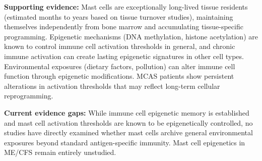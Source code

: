 \begin{open_question}
\textbf{Supporting evidence:} Mast cells are exceptionally long-lived tissue residents (estimated months to years based on tissue turnover studies), maintaining themselves independently from bone marrow and accumulating tissue-specific programming. Epigenetic mechanisms (DNA methylation, histone acetylation) are known to control immune cell activation thresholds in general, and chronic immune activation can create lasting epigenetic signatures in other cell types. Environmental exposures (dietary factors, pollution) can alter immune cell function through epigenetic modifications. MCAS patients show persistent alterations in activation thresholds that may reflect long-term cellular reprogramming.

\textbf{Current evidence gaps:} While immune cell epigenetic memory is established and mast cell activation thresholds are known to be epigenetically controlled, no studies have directly examined whether mast cells archive general environmental exposures beyond standard antigen-specific immunity. Mast cell epigenetics in ME/CFS remain entirely unstudied.
\end{open_question}

